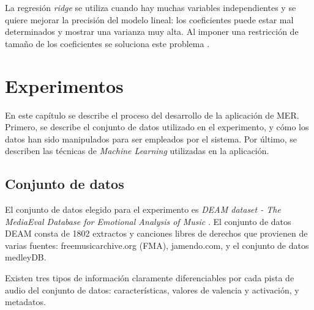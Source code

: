 \documentclass[12pt,a4paper]{article}
\begin{document}
La regresión \textit{ridge} se utiliza cuando hay muchas variables independientes y se quiere mejorar la precisión del modelo lineal: los coeficientes puede estar mal determinados y mostrar una varianza muy alta. Al imponer una restricción de tamaño de los coeficientes se soluciona este problema \cite{fahrmeir2013regression}.










\newpage
\section{Experimentos}
En este capítulo se describe el proceso del desarrollo de la aplicación de MER. Primero, se describe el conjunto de datos utilizado en el experimento, y cómo los datos han sido manipulados para ser empleados por el sistema. Por último, se describen las técnicas de \textit{Machine Learning} utilizadas en la aplicación.


\subsection{Conjunto de datos}
El conjunto de datos elegido para el experimento es \textit{DEAM dataset - The MediaEval Database for Emotional Analysis of Music} \cite{AlajankiEmoInMusicAnalysis}. El conjunto de datos DEAM consta de 1802 extractos y canciones libres de derechos que provienen de varias fuentes: freemusicarchive.org (FMA), jamendo.com,
y el conjunto de datos medleyDB.


Existen tres tipos de información claramente diferenciables por cada pista de audio del conjunto de datos: características, valores de valencia y activación, y metadatos.
\end{document}
